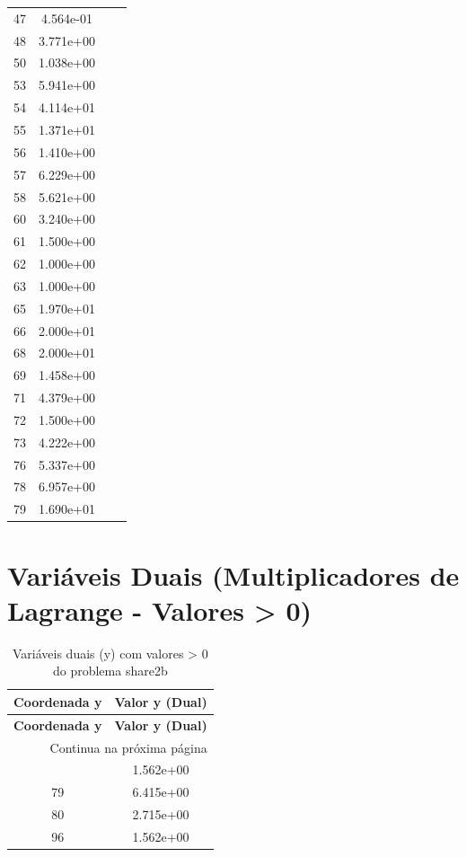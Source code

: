 \documentclass[12pt]{article}
\begin{document}
\begin{longtable}{@{}cccc@{}}
47 & 4.564e-01 &  &  \\
48 & 3.771e+00 &  &  \\
50 & 1.038e+00 &  &  \\
53 & 5.941e+00 &  &  \\
54 & 4.114e+01 &  &  \\
55 & 1.371e+01 &  &  \\
56 & 1.410e+00 &  &  \\
57 & 6.229e+00 &  &  \\
58 & 5.621e+00 &  &  \\
60 & 3.240e+00 &  &  \\
61 & 1.500e+00 &  &  \\
62 & 1.000e+00 &  &  \\
63 & 1.000e+00 &  &  \\
65 & 1.970e+01 &  &  \\
66 & 2.000e+01 &  &  \\
68 & 2.000e+01 &  &  \\
69 & 1.458e+00 &  &  \\
71 & 4.379e+00 &  &  \\
72 & 1.500e+00 &  &  \\
73 & 4.222e+00 &  &  \\
76 & 5.337e+00 &  &  \\
78 & 6.957e+00 &  &  \\
79 & 1.690e+01 &  &  \\

\bottomrule
\end{longtable}


\section{Variáveis Duais (Multiplicadores de Lagrange - Valores > 0)}

\begin{longtable}{@{}cc@{}}
\caption{Variáveis duais (y) com valores > 0 do problema share2b} \\
\toprule
\textbf{Coordenada y} & \textbf{Valor y (Dual)} \\
\midrule
\endfirsthead

\toprule
\textbf{Coordenada y} & \textbf{Valor y (Dual)} \\
\midrule
\endhead

\midrule \multicolumn{2}{r}{{Continua na próxima página}} \\ \midrule
\endfoot

\bottomrule
\endlastfoot
60 & 1.562e+00 \\
79 & 6.415e+00 \\
80 & 2.715e+00 \\
96 & 1.562e+00 \\

\bottomrule
\end{longtable}
\end{document}
